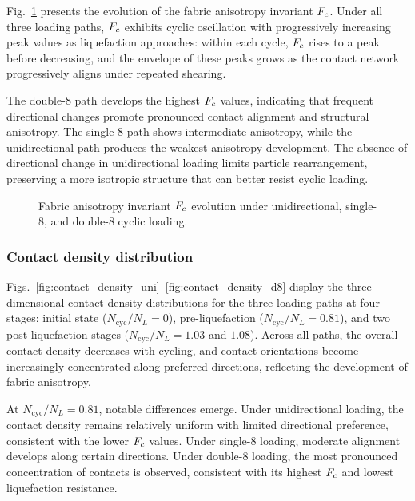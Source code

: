 Fig.~\ref{fig:fc_evolution} presents the evolution of the fabric anisotropy invariant $F_c$. Under all three loading paths, $F_c$ exhibits cyclic oscillation with progressively increasing peak values as liquefaction approaches: within each cycle, $F_c$ rises to a peak before decreasing, and the envelope of these peaks grows as the contact network progressively aligns under repeated shearing.

The double-8 path develops the highest $F_c$ values, indicating that frequent directional changes promote pronounced contact alignment and structural anisotropy. The single-8 path shows intermediate anisotropy, while the unidirectional path produces the weakest anisotropy development. The absence of directional change in unidirectional loading limits particle rearrangement, preserving a more isotropic structure that can better resist cyclic loading.

\begin{figure}
  \centering
  \caption{Fabric anisotropy invariant $F_c$ evolution under unidirectional,
    single-8, and double-8 cyclic loading.}
  \label{fig:fc_evolution}
\end{figure}

\subsubsection{Contact density distribution}

Figs.~\ref{fig:contact_density_uni}--\ref{fig:contact_density_d8} display the three-dimensional contact density distributions for the three loading paths at four stages: initial state ($N_{\mathrm{cyc}}/N_L = 0$), pre-liquefaction ($N_{\mathrm{cyc}}/N_L = 0.81$), and two post-liquefaction stages ($N_{\mathrm{cyc}}/N_L = 1.03$ and $1.08$). Across all paths, the overall contact density decreases with cycling, and contact orientations become increasingly concentrated along preferred directions, reflecting the development of fabric anisotropy.

At $N_{\mathrm{cyc}}/N_L = 0.81$, notable differences emerge. Under unidirectional loading, the contact density remains relatively uniform with limited directional preference, consistent with the lower $F_c$ values. Under single-8 loading, moderate alignment develops along certain directions. Under double-8 loading, the most pronounced concentration of contacts is observed, consistent with its highest $F_c$ and lowest liquefaction resistance.

